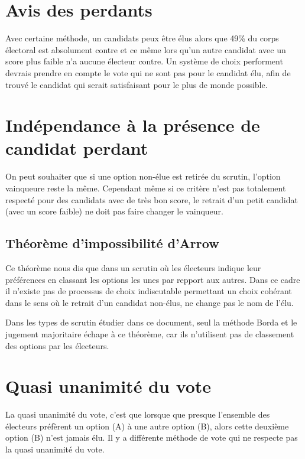 \documentclass[../report]{subfiles}
\begin{document}
  \section{Avis des perdants}

  Avec certaine méthode, un candidats peux être élus alors que 49\% du corps électoral est
  absolument contre et ce même lors qu'un autre candidat avec un score plus faible n'a aucune
  électeur contre.
  Un système de choix performent devrais prendre en compte le vote qui ne sont pas pour le candidat
  élu, afin de trouvé le candidat qui serait satisfaisant pour le plus de monde possible.

  
  \section{Indépendance à la présence de candidat perdant}

  On peut souhaiter que si une option non-élue est retirée du scrutin, l'option vainqueure reste
  la même.
  Cependant même si ce critère n'est pas totalement respecté pour des candidats avec de très bon 
  score, le retrait d'un petit candidat (avec un score faible) ne doit pas faire changer 
  le vainqueur.

  \subsection{Théorème d'impossibilité d'Arrow}

  Ce théorème nous dis que dans un scrutin où les électeurs indique leur préférences en classant les
  options les unes par repport aux autres.
  Dans ce cadre il n'existe pas de processus de choix indiscutable permettant un choix 
  cohérant dans le sens où le retrait d'un candidat non-élus, ne change pas le nom de l'élu.

  Dans les types de scrutin étudier dans ce document, seul la méthode Borda et le 
  jugement majoritaire échape à ce théorème, car ils n'utilisent pas de classement des 
  options par les électeurs.

  \section{Quasi unanimité du vote}

  La quasi unanimité du vote, c'est que lorsque que presque l'ensemble des électeurs préfèrent 
  un option (A) à une autre option (B), alors cette deuxième option (B) n'est jamais élu.
  Il y a différente méthode de vote qui ne respecte pas la quasi unanimité du vote.
\end{document}
